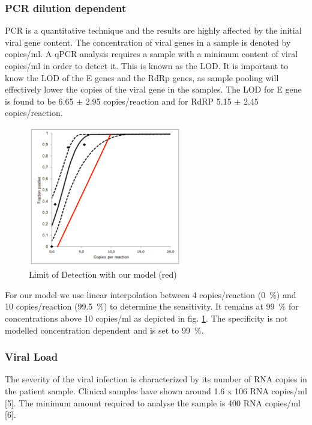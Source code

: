 \documentclass[fleqn,10pt]{wlscirep}
\begin{document}
	\subsubsection{PCR dilution dependent}
	\label{sec:PCR_dilution_dependent}
	PCR is a quantitative technique and the results are highly affected by the initial viral gene content. The concentration of viral genes in a sample is denoted by copies/ml. A qPCR analysis requires a sample with a minimum content of viral copies/ml in order to detect it. This is known as the \gls{LOD}. It is important to know the \gls{LOD} of the E genes and the RdRp genes, as sample pooling will effectively lower the copies of the viral gene in the samples. The \gls{LOD} for E gene is found to be 6.65 $\pm$ 2.95 copies/reaction and for RdRP 5.15 $\pm$ 2.45 copies/reaction.\\
	
	\begin{figure}[ht]
		\centering
		\includegraphics[width=0.6\textwidth]{pics/LOD_1-10.png}
		\caption{Limit of Detection \cite{WHO_Report} with our model (red)}
		\label{fig:LOD}
	\end{figure}
	
	For our model we use linear interpolation between 4 copies/reaction (\SI{0}{\percent}) and 10 copies/reaction (\SI{99.5}{\percent}) to determine the sensitivity. It remains at \SI{99}{\percent} for concentrations above 10 copies/ml as depicted in fig. \ref{fig:LOD}. The specificity is not modelled concentration dependent and is set to \SI{99}{\percent}. 
	
	
	\subsubsection{Viral Load}
	The severity of the viral infection is characterized by its number of RNA copies in the patient sample. Clinical samples have shown around 1.6 x 106 RNA copies/ml [5]. The minimum amount required to analyse the sample is 400 RNA copies/ml [6].\\
	
\end{document}

